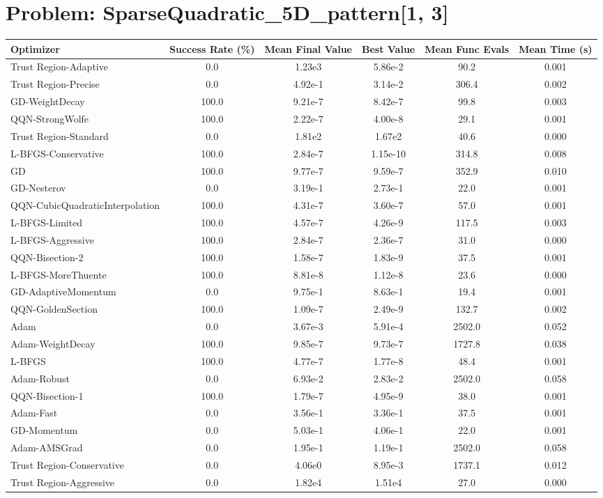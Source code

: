 \documentclass{article}
\begin{document}
\section{Problem: SparseQuadratic\_5D\_pattern[1, 3]}
\begin{longtable}{p{3cm}*{5}{c}}
\toprule
\textbf{Optimizer} & \textbf{Success Rate (\%)} & \textbf{Mean Final Value} & \textbf{Best Value} & \textbf{Mean Func Evals} & \textbf{Mean Time (s)} \\
\midrule
Trust Region-Adaptive & 0.0 & 1.23e3 & 5.86e-2 & 90.2 & 0.001 \\
Trust Region-Precise & 0.0 & 4.92e-1 & 3.14e-2 & 306.4 & 0.002 \\
GD-WeightDecay & 100.0 & 9.21e-7 & 8.42e-7 & 99.8 & 0.003 \\
QQN-StrongWolfe & 100.0 & 2.22e-7 & 4.00e-8 & 29.1 & 0.001 \\
Trust Region-Standard & 0.0 & 1.81e2 & 1.67e2 & 40.6 & 0.000 \\
L-BFGS-Conservative & 100.0 & 2.84e-7 & 1.15e-10 & 314.8 & 0.008 \\
GD & 100.0 & 9.77e-7 & 9.59e-7 & 352.9 & 0.010 \\
GD-Nesterov & 0.0 & 3.19e-1 & 2.73e-1 & 22.0 & 0.001 \\
QQN-CubicQuadraticInterpolation & 100.0 & 4.31e-7 & 3.60e-7 & 57.0 & 0.001 \\
L-BFGS-Limited & 100.0 & 4.57e-7 & 4.26e-9 & 117.5 & 0.003 \\
L-BFGS-Aggressive & 100.0 & 2.84e-7 & 2.36e-7 & 31.0 & 0.000 \\
QQN-Bisection-2 & 100.0 & 1.58e-7 & 1.83e-9 & 37.5 & 0.001 \\
L-BFGS-MoreThuente & 100.0 & 8.81e-8 & 1.12e-8 & 23.6 & 0.000 \\
GD-AdaptiveMomentum & 0.0 & 9.75e-1 & 8.63e-1 & 19.4 & 0.001 \\
QQN-GoldenSection & 100.0 & 1.09e-7 & 2.49e-9 & 132.7 & 0.002 \\
Adam & 0.0 & 3.67e-3 & 5.91e-4 & 2502.0 & 0.052 \\
Adam-WeightDecay & 100.0 & 9.85e-7 & 9.73e-7 & 1727.8 & 0.038 \\
L-BFGS & 100.0 & 4.77e-7 & 1.77e-8 & 48.4 & 0.001 \\
Adam-Robust & 0.0 & 6.93e-2 & 2.83e-2 & 2502.0 & 0.058 \\
QQN-Bisection-1 & 100.0 & 1.79e-7 & 4.95e-9 & 38.0 & 0.001 \\
Adam-Fast & 0.0 & 3.56e-1 & 3.36e-1 & 37.5 & 0.001 \\
GD-Momentum & 0.0 & 5.03e-1 & 4.06e-1 & 22.0 & 0.001 \\
Adam-AMSGrad & 0.0 & 1.95e-1 & 1.19e-1 & 2502.0 & 0.058 \\
Trust Region-Conservative & 0.0 & 4.06e0 & 8.95e-3 & 1737.1 & 0.012 \\
Trust Region-Aggressive & 0.0 & 1.82e4 & 1.51e4 & 27.0 & 0.000 \\
\bottomrule
\end{longtable}
\end{document}
